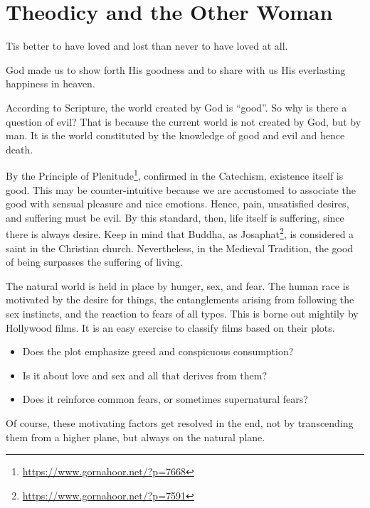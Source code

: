 \section{Theodicy and the Other Woman}

\begin{quotex}
Tis better to have loved and lost than never to have loved at all.

God made us to show forth His goodness and to share with us His everlasting happiness in heaven. 
\end{quotex}


According to Scripture, the world created by God is ``good''. So why is there a question of evil? That is because the current world is not created by God, but by man. It is the world constituted by the knowledge of good and evil and hence death.

By the Principle of Plenitude\footnote{\url{https://www.gornahoor.net/?p=7668}}, confirmed in the Catechism, existence itself is good. This may be counter-intuitive because we are accustomed to associate the good with sensual pleasure and nice emotions. Hence, pain, unsatisfied desires, and suffering must be evil. By this standard, then, life itself is suffering, since there is always desire. Keep in mind that Buddha, as Josaphat\footnote{\url{https://www.gornahoor.net/?p=7591}}, is considered a saint in the Christian church. Nevertheless, in the Medieval Tradition, the good of being surpasses the suffering of living.

The natural world is held in place by hunger, sex, and fear. The human race is motivated by the desire for things, the entanglements arising from following the sex instincts, and the reaction to fears of all types. This is borne out mightily by Hollywood films. It is an easy exercise to classify films based on their plots.

\begin{itemize}


\item Does the plot emphasize greed and conspicuous consumption?

\item Is it about love and sex and all that derives from them?

\item Does it reinforce common fears, or sometimes supernatural fears?
\end{itemize}


Of course, these motivating factors get resolved in the end, not by transcending them from a higher plane, but always on the natural plane.

